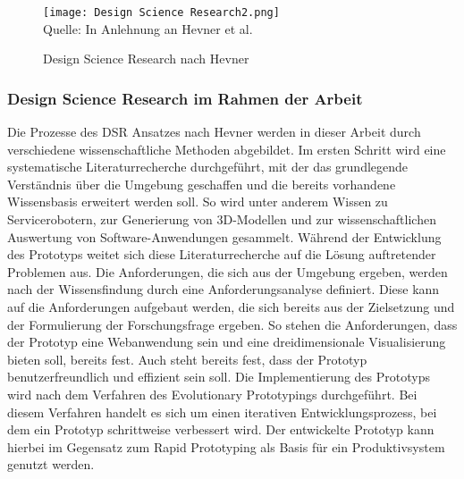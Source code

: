 \begin{figure}[H]
    \caption{Design Science Research nach Hevner}\label{fig:DesignScienceResearch}
    \texttt{[image: Design Science Research2.png]}
    \\
    Quelle: In Anlehnung an Hevner et al. \cite[S.~80]{Hevner2004}
\end{figure}

\subsubsection{Design Science Research im Rahmen der Arbeit}

Die Prozesse des \ac{DSR} Ansatzes nach Hevner werden in dieser Arbeit durch verschiedene wissenschaftliche Methoden abgebildet. Im ersten Schritt wird eine systematische Literaturrecherche durchgeführt, mit der das grundlegende Verständnis über die Umgebung geschaffen und die bereits vorhandene Wissensbasis erweitert werden soll. So wird unter anderem Wissen zu Servicerobotern, zur Generierung von 3D-Modellen und zur wissenschaftlichen Auswertung von Software-Anwendungen gesammelt. Während der Entwicklung des Prototyps weitet sich diese Literaturrecherche auf die Lösung auftretender Problemen aus. Die Anforderungen, die sich aus der Umgebung ergeben, werden nach der Wissensfindung durch eine Anforderungsanalyse definiert. Diese kann auf die Anforderungen aufgebaut werden, die sich bereits aus der Zielsetzung und der Formulierung der Forschungsfrage ergeben. So stehen die Anforderungen, dass der Prototyp eine Webanwendung sein und eine dreidimensionale Visualisierung bieten soll, bereits fest. Auch steht bereits fest, dass der Prototyp benutzerfreundlich und effizient sein soll. Die Implementierung des Prototyps wird nach dem Verfahren des Evolutionary Prototypings durchgeführt. Bei diesem Verfahren handelt es sich um einen iterativen Entwicklungsprozess, bei dem ein Prototyp schrittweise verbessert wird. Der entwickelte Prototyp kann hierbei im Gegensatz zum Rapid Prototyping als Basis für ein Produktivsystem genutzt werden.\cite[S.~17-18]{Crinnion1992}
